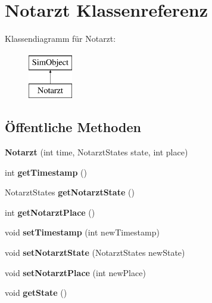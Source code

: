 \hypertarget{classNotarzt}{}\section{Notarzt Klassenreferenz}
\label{classNotarzt}
Klassendiagramm für Notarzt\+:\begin{figure}[H]
\begin{center}
\leavevmode
\includegraphics[height=2.000000cm]{classNotarzt}
\end{center}
\end{figure}
\subsection*{Öffentliche Methoden}
\begin{DoxyCompactItemize}
\item 
{\bfseries Notarzt} (int time, Notarzt\+States state, int place)\hypertarget{classNotarzt_a6b1615d76bbe776b0cba25d5ad6d5f8e}{}\label{classNotarzt_a6b1615d76bbe776b0cba25d5ad6d5f8e}

\item 
int {\bfseries get\+Timestamp} ()\hypertarget{classNotarzt_af94182cd4fc47929260c9ce3e129028f}{}\label{classNotarzt_af94182cd4fc47929260c9ce3e129028f}

\item 
Notarzt\+States {\bfseries get\+Notarzt\+State} ()\hypertarget{classNotarzt_a460b020d5f78bf43de6d82b30315bc68}{}\label{classNotarzt_a460b020d5f78bf43de6d82b30315bc68}

\item 
int {\bfseries get\+Notarzt\+Place} ()\hypertarget{classNotarzt_a066e840824b26d97d7e02f5eb697bf33}{}\label{classNotarzt_a066e840824b26d97d7e02f5eb697bf33}

\item 
void {\bfseries set\+Timestamp} (int new\+Timestamp)\hypertarget{classNotarzt_a2443bb2d3a8fad6ad868db80d93add93}{}\label{classNotarzt_a2443bb2d3a8fad6ad868db80d93add93}

\item 
void {\bfseries set\+Notarzt\+State} (Notarzt\+States new\+State)\hypertarget{classNotarzt_a08bfaf5815206e487ff29d87f0e9ab0c}{}\label{classNotarzt_a08bfaf5815206e487ff29d87f0e9ab0c}

\item 
void {\bfseries set\+Notarzt\+Place} (int new\+Place)\hypertarget{classNotarzt_a3ccdfae8cbaebbe4d0ff049f05e78016}{}\label{classNotarzt_a3ccdfae8cbaebbe4d0ff049f05e78016}

\item 
void {\bfseries get\+State} ()\hypertarget{classNotarzt_a938d1d749b2741f3dc426e24a437c43c}{}\label{classNotarzt_a938d1d749b2741f3dc426e24a437c43c}

\end{DoxyCompactItemize}


